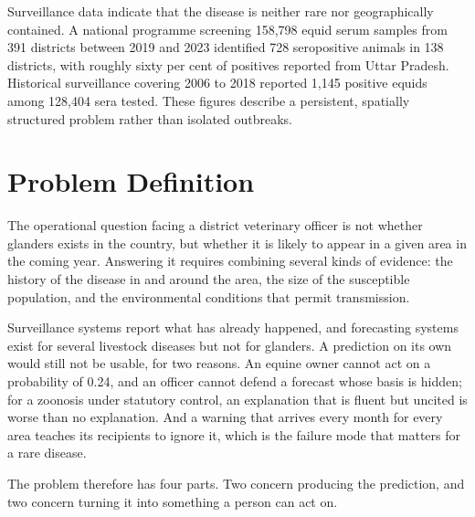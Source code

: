 \documentclass[10pt,openany]{report}
\begin{document}
Surveillance data indicate that the disease is neither rare nor geographically contained. A
national programme screening 158,798 equid serum samples from 391 districts between 2019 and
2023 identified 728 seropositive animals in 138 districts, with roughly sixty per cent of
positives reported from Uttar Pradesh. Historical surveillance covering 2006 to 2018 reported
1,145 positive equids among 128,404 sera tested. These figures describe a persistent, spatially
structured problem rather than isolated outbreaks.

\section{Problem Definition}

The operational question facing a district veterinary officer is not whether glanders exists in
the country, but whether it is likely to appear in a given area in the coming year. Answering it
requires combining several kinds of evidence: the history of the disease in and around the area,
the size of the susceptible population, and the environmental conditions that permit
transmission.

Surveillance systems report what has already happened, and forecasting systems exist for several
livestock diseases but not for glanders. A prediction on its own would still not be usable, for two
reasons. An equine owner cannot act on a probability of 0.24, and an officer cannot defend a forecast
whose basis is hidden; for a zoonosis under statutory control, an explanation that is fluent but
uncited is worse than no explanation. And a warning that arrives every month for every area teaches
its recipients to ignore it, which is the failure mode that matters for a rare disease.

The problem therefore has four parts. Two concern producing the prediction, and two concern
turning it into something a person can act on.
\end{document}
